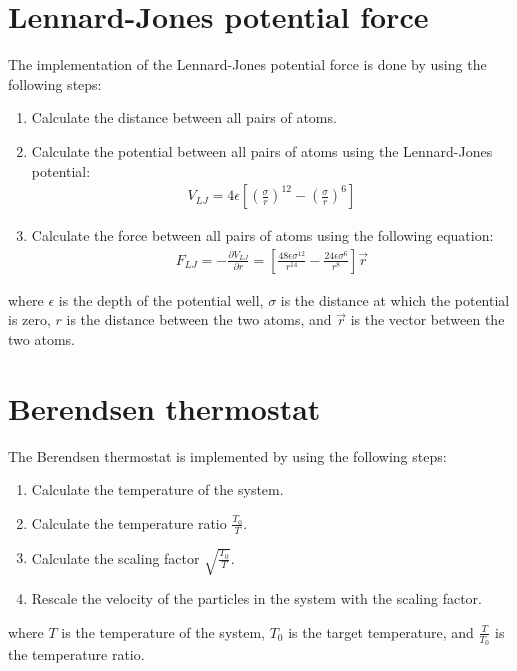 \section{Lennard-Jones potential force}
    The implementation of the Lennard-Jones potential force is done by using the following steps:
    \begin{enumerate}
        \item Calculate the distance between all pairs of atoms.
        \item Calculate the potential between all pairs of atoms using the Lennard-Jones potential:
        \begin{equation}
        \label{eq:LJ}
            \begin{aligned}
            V_{LJ} = 4\epsilon\left[\left(\frac{\sigma}{r}\right)^{12} - \left(\frac{\sigma}{r}\right)^{6}\right]
            \end{aligned}
        \end{equation}
        \item Calculate the force between all pairs of atoms using the following equation:
        \begin{equation}
        \label{eq:force}
            \begin{aligned}
            F_{LJ} = -\frac{\partial V_{LJ}}{\partial r} = \left[\frac{48 \epsilon \sigma^{12}}{r^{14}} - \frac{24 \epsilon \sigma^6}{r^{8}} \right] \vec{r}
            \end{aligned}
        \end{equation}
    \end{enumerate}
    where $\epsilon$ is the depth of the potential well, $\sigma$ is the distance at which the potential is zero, $r$ is the distance between the two atoms, and $\vec{r}$ is the vector between the two atoms.


\section{Berendsen thermostat}
    The Berendsen thermostat is implemented by using the following steps:
    \begin{enumerate}
        \item Calculate the temperature of the system.
        \item Calculate the temperature ratio $\frac{T_0}{T}$.
        \item Calculate the scaling factor $\sqrt{\frac{T_0}{T}}$.
        \item Rescale the velocity of the particles in the system with the scaling factor.
    \end{enumerate}
    where $T$ is the temperature of the system, $T_0$ is the target temperature, and $\frac{T}{T_0}$ is the temperature ratio.


